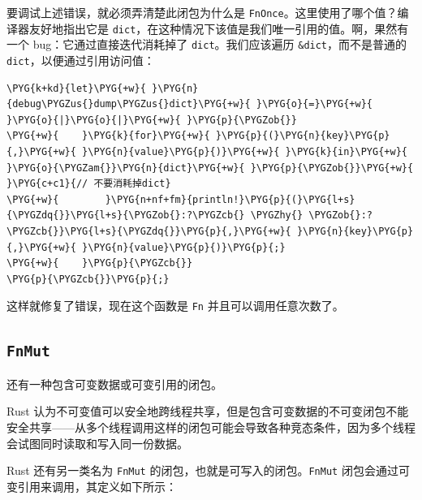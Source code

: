 要调试上述错误，就必须弄清楚此闭包为什么是 \texttt{FnOnce}。这里使用了哪个值？编译器友好地指出它是 \texttt{dict}，在这种情况下该值是我们唯一引用的值。啊，果然有一个 bug：它通过直接迭代消耗掉了 \texttt{dict}。我们应该遍历 \texttt{\&dict}，而不是普通的 \texttt{dict}，以便通过引用访问值：

\begin{Verbatim}[commandchars=\\\{\},breaklines=true,breakanywhere=true,fontsize=\codefont,xleftmargin=17bp]
\PYG{k+kd}{let}\PYG{+w}{ }\PYG{n}{debug\PYGZus{}dump\PYGZus{}dict}\PYG{+w}{ }\PYG{o}{=}\PYG{+w}{ }\PYG{o}{|}\PYG{o}{|}\PYG{+w}{ }\PYG{p}{\PYGZob{}}
\PYG{+w}{    }\PYG{k}{for}\PYG{+w}{ }\PYG{p}{(}\PYG{n}{key}\PYG{p}{,}\PYG{+w}{ }\PYG{n}{value}\PYG{p}{)}\PYG{+w}{ }\PYG{k}{in}\PYG{+w}{ }\PYG{o}{\PYGZam{}}\PYG{n}{dict}\PYG{+w}{ }\PYG{p}{\PYGZob{}}\PYG{+w}{  }\PYG{c+c1}{// 不要消耗掉dict}
\PYG{+w}{        }\PYG{n+nf+fm}{println!}\PYG{p}{(}\PYG{l+s}{\PYGZdq{}}\PYG{l+s}{\PYGZob{}:?\PYGZcb{} \PYGZhy{} \PYGZob{}:?\PYGZcb{}}\PYG{l+s}{\PYGZdq{}}\PYG{p}{,}\PYG{+w}{ }\PYG{n}{key}\PYG{p}{,}\PYG{+w}{ }\PYG{n}{value}\PYG{p}{)}\PYG{p}{;}
\PYG{+w}{    }\PYG{p}{\PYGZcb{}}
\PYG{p}{\PYGZcb{}}\PYG{p}{;}
\end{Verbatim}

这样就修复了错误，现在这个函数是 \texttt{Fn} 并且可以调用任意次数了。

\subsection{\texttt{FnMut}}

还有一种包含可变数据或可变引用的闭包。

Rust 认为不可变值可以安全地跨线程共享，但是包含可变数据的不可变闭包不能安全共享——从多个线程调用这样的闭包可能会导致各种竞态条件，因为多个线程会试图同时读取和写入同一份数据。

Rust 还有另一类名为 \texttt{FnMut} 的闭包，也就是可写入的闭包。\texttt{FnMut} 闭包会通过可变引用来调用，其定义如下所示：

